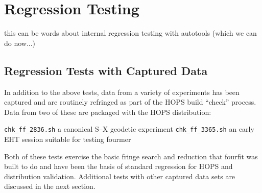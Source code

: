 %
%
\section{Regression Testing}
\label{sec:regress}

this can be words about internal regression testing with autotools
(which we can do now...)


\subsection{Regression Tests with Captured Data}
\label{sec:captdatareq}

In addition to the above tests, data from a variety of experiments
has been captured and are routinely refringed as part of the
HOPS build ``check'' process.  Data from two of
these are packaged with the HOPS distribution:

\begin{description}
 \texttt{chk\_ff\_2836.sh} a canonical S--X geodetic experiment
 \texttt{chk\_ff\_3365.sh} an early \ac{EHT} session suitable for
    testing \ac{fourmer}
\end{description}
Both of these tests exercise the basic fringe search and reduction
that \acs{fourfit} was built to do and have been the basis of standard
regression for HOPS and distribution validation.   Additional tests
with other captured data sets are discussed in the next section.







